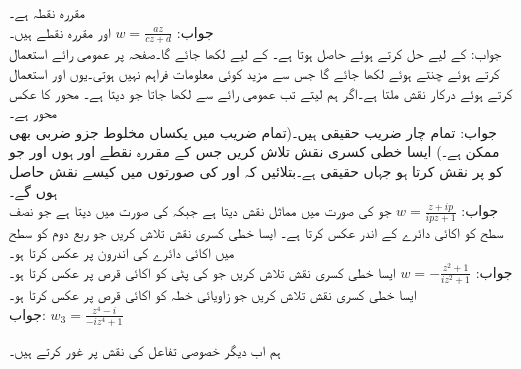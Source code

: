 \quad
{} مقررہ نقطہ ہے۔\\
جواب:\quad
$w=\tfrac{az}{cz+d}$
\quad
{}  اور  مقررہ نقطے ہیں۔\\
جواب:\quad
{} کے لیے حل کرتے ہوئے  حاصل ہوتا ہے۔ کے لیے  لکھا جائے گا۔صفحہ  پر عمومی رائے استعمال کرتے ہوئے  چنتے ہوئے  لکھا جائے گا جس سے مزید کوئی معلومات فراہم نہیں ہوتی۔یوں  اور  استعمال کرتے ہوئے درکار نقش  ملتا ہے۔اگر ہم  لیتے تب عمومی رائے سے  لکھا جاتا جو  دیتا ہے۔
\quad
محور  کا عکس محور    ہے۔\\
جواب:\quad
تمام چار  ضریب  حقیقی ہیں۔(تمام  ضریب  میں یکساں مخلوط جزو ضربی بھی ممکن ہے۔)
\quad
ایسا خطی کسری نقش تلاش  کریں جس کے مقررہ نقطے  اور  ہوں اور جو  کو  پر نقش کرتا ہو جہاں  حقیقی ہے۔بتلائیں کہ  اور  کی صورتوں میں کیسے نقش حاصل ہوں گے۔\\
جواب:\quad
$w=\tfrac{z+ip}{ipz+1}$
جو  کی صورت میں مماثل نقش  دیتا ہے جبکہ  کی صورت میں  دیتا ہے جو نصف سطح کو اکائی دائرے کے اندر عکس کرتا ہے۔
\quad
ایسا خطی کسری نقش تلاش کریں جو ربع دوم کو  سطح میں اکائی دائرے کی اندرون پر عکس کرتا ہو۔\\
جواب:\quad
$w=-\tfrac{z^2+1}{iz^2+1}$ 
\quad
ایسا خطی کسری نقش  تلاش کریں جو  کی پٹی کو اکائی قرص  پر عکس کرتا ہو۔
\quad
ایسا خطی کسری نقش  تلاش کریں جو زاویائی خطہ  کو اکائی قرص  پر عکس کرتا ہو۔\\
جواب:\quad
 $w_3=\tfrac{z^4-i}{-iz^4+1}$

ہم اب دیگر خصوصی تفاعل کی نقش پر غور کرتے ہیں۔

